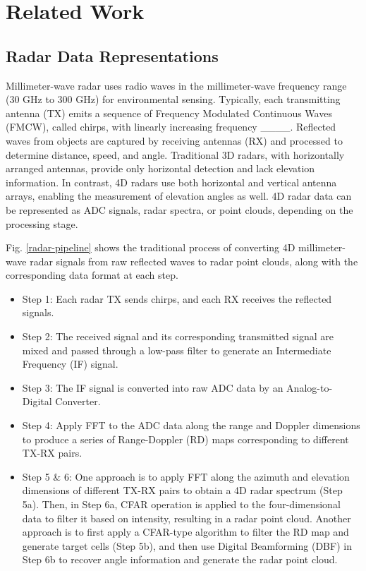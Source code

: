 \section{Related Work}
\subsection{Radar Data Representations}
Millimeter-wave radar uses radio waves in the millimeter-wave frequency range (30 GHz to 300 GHz) for environmental sensing. 
Typically, each transmitting antenna (TX) emits a sequence of Frequency Modulated Continuous Waves (FMCW), called chirps, 
with linearly increasing frequency ____. 
Reflected waves from objects are captured by receiving antennas (RX) and processed to determine distance, speed, and angle. 
Traditional 3D radars, with horizontally arranged antennas, 
provide only horizontal detection and lack elevation information. 
In contrast, 4D radars use both horizontal and vertical antenna arrays, 
enabling the measurement of elevation angles as well. 
4D radar data can be represented as ADC signals, radar spectra, or point clouds, 
depending on the processing stage. 


Fig. \ref{radar-pipeline} shows the traditional process of converting 4D millimeter-wave radar signals 
from raw reflected waves to radar point clouds, 
along with the corresponding data format at each step.
\begin{itemize}
	\item Step 1: Each radar TX sends chirps, and each RX receives the reflected signals.
	\item Step 2: The received signal and its corresponding transmitted signal are mixed 
							and passed through a low-pass filter to generate an Intermediate Frequency (IF) signal.
	\item Step 3: The IF signal is converted into raw ADC data by an Analog-to-Digital Converter.
	\item Step 4: Apply FFT to the ADC data along the range and Doppler dimensions to produce a series of Range-Doppler (RD) maps 
						corresponding to different TX-RX pairs.
	\item Step 5 \& 6: One approach is to apply FFT along the azimuth and elevation dimensions of different TX-RX pairs
									to obtain a 4D radar spectrum (Step 5a). 
									Then, in Step 6a, CFAR operation is applied to the four-dimensional data to filter it based on intensity, 
									resulting in a radar point cloud. 
									Another approach is to first apply a CFAR-type algorithm to filter the RD map and generate target cells (Step 5b), 
									and then use Digital Beamforming (DBF) in Step 6b to recover angle information and generate the radar point cloud.
\end{itemize}



